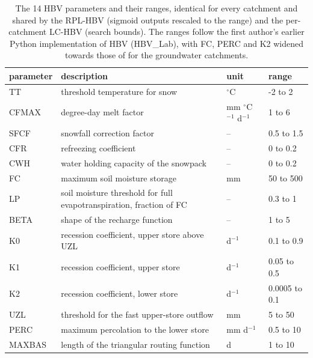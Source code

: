 \begin{table}[htbp]
\centering
\footnotesize
\setlength{\tabcolsep}{4pt}
\caption{The 14 HBV parameters and their ranges, identical for every catchment and shared by the RPL-HBV (sigmoid outputs rescaled to the range) and the per-catchment LC-HBV (search bounds). The ranges follow the first author's earlier Python implementation of HBV (HBV\_Lab), with FC, PERC and K2 widened towards those of \citet{seibert2012} for the groundwater catchments.}
\label{tab:hbv_params}
\begin{tabular}{llll}
\toprule
parameter & description & unit & range \\
\midrule
TT & threshold temperature for snow & $^{\circ}$C & -2 to 2 \\
CFMAX & degree-day melt factor & mm $^{\circ}$C$^{-1}$ d$^{-1}$ & 1 to 6 \\
SFCF & snowfall correction factor & -- & 0.5 to 1.5 \\
CFR & refreezing coefficient & -- & 0 to 0.2 \\
CWH & water holding capacity of the snowpack & -- & 0 to 0.2 \\
FC & maximum soil moisture storage & mm & 50 to 500 \\
LP & soil moisture threshold for full evapotranspiration, fraction of FC & -- & 0.3 to 1 \\
BETA & shape of the recharge function & -- & 1 to 5 \\
K0 & recession coefficient, upper store above UZL & d$^{-1}$ & 0.1 to 0.9 \\
K1 & recession coefficient, upper store & d$^{-1}$ & 0.05 to 0.5 \\
K2 & recession coefficient, lower store & d$^{-1}$ & 0.0005 to 0.1 \\
UZL & threshold for the fast upper-store outflow & mm & 5 to 50 \\
PERC & maximum percolation to the lower store & mm d$^{-1}$ & 0.5 to 10 \\
MAXBAS & length of the triangular routing function & d & 1 to 10 \\
\bottomrule
\end{tabular}
\end{table}

